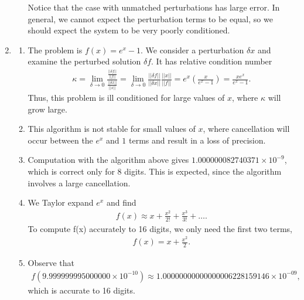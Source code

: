 \documentclass[10pt]{article}
\begin{document}
\begin{enumerate}
\begin{enumerate}
      Notice that the case with unmatched perturbations has large error. In general, we cannot expect the perturbation terms to be equal, so we should expect the system to be very poorly conditioned.
    \end{enumerate}

    \item \begin{enumerate}
      \item The problem is \(f(x) = e^x - 1\). We consider a perturbation \(\delta x\) and examine the perturbed solution \(\delta f\). It has relative condition number \begin{align*}
        \kappa = \lim_{\delta \to 0} \frac{\frac{||\delta f||}{||f||}}{\frac{||\delta x||}{||x||}} = \lim_{\delta \to 0} \frac{||\delta f||}{||\delta x||} \frac{||x||}{||f||} = e^x \left( \frac{x}{e^x-1} \right) = \frac{xe^x}{e^x-1}.
      \end{align*} Thus, this problem is ill conditioned for large values of \(x\), where \(\kappa \) will grow large.

      \item This algorithm is not stable for small values of \(x\), where cancellation will occur between the \(e^x\) and \(1\) terms and result in a loss of precision.
      
      \item Computation with the algorithm above gives \(1.000000082740371 \times 10^{-9}\), which is correct only for 8 digits. This is expected, since the algorithm involves a large cancellation.
      
      \item We Taylor expand \(e^x\) and find \begin{align*}
          f(x) \approx x + \frac{x^2}{2!} + \frac{x^3}{3!} + \dots.
      \end{align*} To compute f(x) accurately to 16 digits, we only need the first two terms, \begin{align*}
          f(x) = x + \frac{x^2}{2}.
      \end{align*}

      \item Observe that \begin{align*}
          f(9.999999995000000\times 10^{-10}) \approx 1.00000000000000006228159146 \times 10^{-09},
      \end{align*} which is accurate to 16 digits.

    \end{enumerate}


\end{enumerate}
\end{document}

